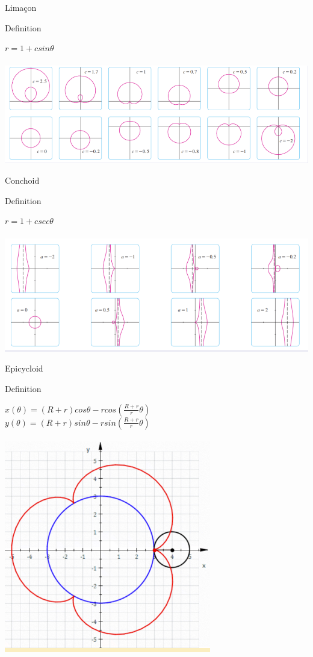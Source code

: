 \begin{frame}{Limaçon}
    \begin{block}{Definition}
        \begin{center}
            $r=1+c sin\theta$\\~\\
            \includegraphics[width=0.85\linewidth]{res/limacon.png}
        \end{center}
    \end{block}
\end{frame}
\begin{frame}{Conchoid}
    \begin{block}{Definition}
        \begin{center}
            $r=1+c sec\theta$\\~\\
            \includegraphics[width=0.85\linewidth]{res/Conchoid.png}
        \end{center}
    \end{block}
\end{frame}
\begin{frame}{Epicycloid}
    \begin{block}{Definition}
        \begin{center}
            $x(\theta)=(R+r)cos\theta-r cos(\frac{R+r}{r}\theta)$\\
            $y(\theta)=(R+r)sin\theta-r sin(\frac{R+r}{r}\theta)$\\~\\
            \includegraphics[width=0.55\linewidth]{res/Epicycloid.png}
        \end{center}
    \end{block}
\end{frame}
